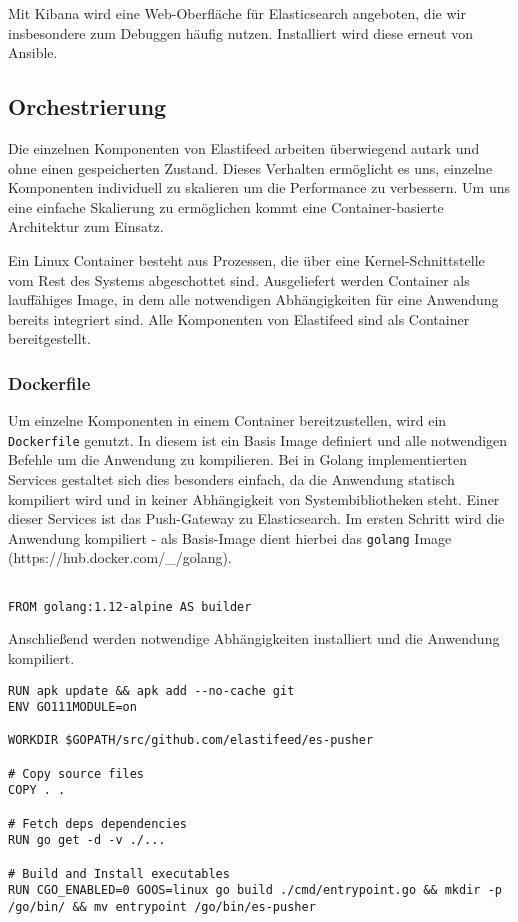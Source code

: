 Mit Kibana wird eine Web-Oberfläche für Elasticsearch angeboten, die wir insbesondere zum Debuggen häufig nutzen. Installiert wird diese erneut von Ansible.
\endsubsection

\subsection{Orchestrierung}
Die einzelnen Komponenten von Elastifeed arbeiten überwiegend autark und ohne einen gespeicherten Zustand.
Dieses Verhalten ermöglicht es uns, einzelne Komponenten individuell zu skalieren um die Performance zu verbessern.
Um uns eine einfache Skalierung zu ermöglichen kommt eine Container-basierte Architektur zum Einsatz.

Ein Linux Container besteht aus Prozessen, die über eine Kernel-Schnittstelle vom Rest des Systems abgeschottet sind. Ausgeliefert werden Container als lauffähiges Image, in dem alle notwendigen Abhängigkeiten für eine Anwendung bereits integriert sind.
Alle Komponenten von Elastifeed sind als Container bereitgestellt.
\endsubsubsection

\subsubsection{Dockerfile}

Um einzelne Komponenten in einem Container bereitzustellen, wird ein \texttt{Dockerfile} genutzt.
In diesem ist ein Basis Image definiert und alle notwendigen Befehle um die Anwendung zu kompilieren.
Bei in Golang implementierten Services gestaltet sich dies besonders einfach, da die Anwendung statisch kompiliert wird und in keiner Abhängigkeit von Systembibliotheken steht.
Einer dieser Services ist das Push-Gateway zu Elasticsearch.
Im ersten Schritt wird die Anwendung kompiliert - als Basis-Image dient hierbei das \texttt{golang} Image (https://hub.docker.com/\_/golang).

\begin{lstlisting}

FROM golang:1.12-alpine AS builder

\end{lstlisting}

Anschließend werden notwendige Abhängigkeiten installiert und die Anwendung kompiliert.

\begin{lstlisting}
RUN apk update && apk add --no-cache git
ENV GO111MODULE=on

WORKDIR $GOPATH/src/github.com/elastifeed/es-pusher

# Copy source files
COPY . .

# Fetch deps dependencies
RUN go get -d -v ./...

# Build and Install executables
RUN CGO_ENABLED=0 GOOS=linux go build ./cmd/entrypoint.go && mkdir -p /go/bin/ && mv entrypoint /go/bin/es-pusher
\end{lstlisting}

